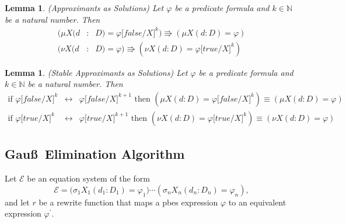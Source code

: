 \documentclass{article}
\newtheorem{lemma}[theorem]{Lemma}
\begin{document}
\begin{lemma}
(Approximants as Solutions) Let $\varphi $ be a predicate formula and $k\in
\mathbb{N}$ be a natural number. Then%
\begin{eqnarray*}
(\mu X(d &:&D)=\varphi \lbrack false /X]^{k})\Rrightarrow (\mu X(d:D)=\varphi
) \\
(\nu X(d &:&D)=\varphi )\Rrightarrow (\nu X(d:D)=\varphi \lbrack true
/X]^{k})
\end{eqnarray*}
\end{lemma}

\begin{lemma}
(Stable Approximants as Solutions) Let $\varphi $ be a predicate formula and
$k\in \mathbb{N}$ be a natural number. Then%
\begin{eqnarray*}
\text{if }\varphi \lbrack false /X]^{k} &\longleftrightarrow &\varphi \lbrack
false /X]^{k+1}\text{ then }(\mu X(d:D)=\varphi \lbrack false /X]^{k})\equiv
(\mu X(d:D)=\varphi ) \\
\text{if }\varphi \lbrack true /X]^{k} &\longleftrightarrow &\varphi \lbrack
true /X]^{k+1}\text{ then }(\nu X(d:D)=\varphi \lbrack true /X]^{k})\equiv
(\nu X(d:D)=\varphi )
\end{eqnarray*}
\end{lemma}

\pagebreak

\subsection{Gau\ss\ Elimination Algorithm}

Let $\mathcal{E}$ be an equation system of the form%
\begin{equation*}
\mathcal{E=(}\sigma _{1}X_{1}(d_{1}:D_{1})=\varphi _{1})\cdots (\sigma
_{n}X_{n}(d_{n}:D_{n})=\varphi _{n}),
\end{equation*}%
and let $r$ be a rewrite function that maps a pbes expression $\varphi $ to
an equivalent expression $\varphi ^{\prime }$.
\end{document}
